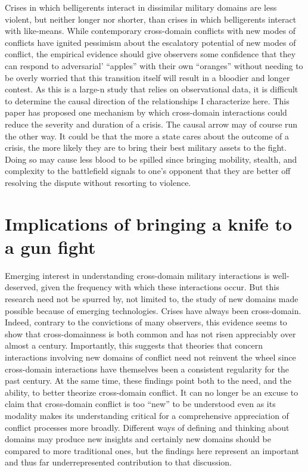 \documentclass[
]{article}
\begin{document}
Crises in which belligerents interact in dissimilar military domains are less violent, but neither longer nor shorter, than crises in which belligerents interact with like-means. While contemporary cross-domain conflicts with new modes of conflicts have ignited pessimism about the escalatory potential of new modes of conflict, the empirical evidence should give observers some confidence that they can respond to adversarial' ``apples'' with their own ``oranges'' without needing to be overly worried that this transition itself will result in a bloodier and longer contest. As this is a large-n study that relies on observational data, it is difficult to determine the causal direction of the relationships I characterize here. This paper has proposed one mechanism by which cross-domain interactions could reduce the severity and duration of a crisis. The causal arrow may of course run the other way. It could be that the more a state cares about the outcome of a crisis, the more likely they are to bring their best military assets to the fight. Doing so may cause less blood to be spilled since bringing mobility, stealth, and complexity to the battlefield signals to one's opponent that they are better off resolving the dispute without resorting to violence.

\hypertarget{implications-of-bringing-a-knife-to-a-gun-fight}{%
\section{Implications of bringing a knife to a gun fight}\label{implications-of-bringing-a-knife-to-a-gun-fight}}

Emerging interest in understanding cross-domain military interactions is well-deserved, given the frequency with which these interactions occur. But this research need not be spurred by, not limited to, the study of new domains made possible because of emerging technologies. Crises have always been cross-domain. Indeed, contrary to the convictions of many observers, this evidence seems to show that cross-domainness is both common and has not risen appreciably over almost a century. Importantly, this suggests that theories that concern interactions involving new domains of conflict need not reinvent the wheel since cross-domain interactions have themselves been a consistent regularity for the past century. At the same time, these findings point both to the need, and the ability, to better theorize cross-domain conflict. It can no longer be an excuse to claim that cross-domain conflict is too ``new'' to be understood even as its modality makes its understanding critical for a comprehensive appreciation of conflict processes more broadly. Different ways of defining and thinking about domains may produce new insights and certainly new domains should be compared to more traditional ones, but the findings here represent an important and thus far underrepresented contribution to that discussion.
\end{document}

